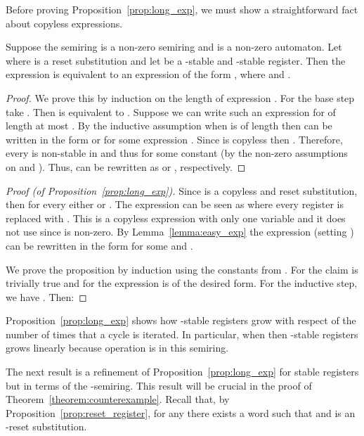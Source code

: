 Before proving Proposition~\ref{prop:long_exp}, we must show a straightforward fact about copyless expressions.
\begin{lemma}
	\label{lemma:easy_exp}
	Suppose the semiring  is a non-zero semiring and  is a non-zero automaton.
	Let  where  is a reset substitution and let  be a -stable and -stable register.
Then the expression  is equivalent to an expression of the form , where  and .
\end{lemma}

\begin{proof}
	We prove this by induction on the length of expression . For the base step take . Then  is equivalent to . Suppose we can write such an expression  for  of length at most . By the inductive assumption when  is of length  then  can be written in the form  or  for some expression . 
Since  is copyless then .
	Therefore, every  is non-stable in  and thus  for some constant  (by the non-zero assumptions on  and ). 
Thus,  can be rewritten as  or , respectively.
\end{proof}


\begin{proof}[Proof (of Proposition~\ref{prop:long_exp})]
	Since  is a copyless and reset substitution, then for every  either  or . 
	The expression  can be seen as  where every register  is replaced with . This is a copyless expression with only one variable  and it does not use  since  is non-zero. By Lemma~\ref{lemma:easy_exp} the expression  (setting ) can be rewritten in the form  for some  and .
	
	We prove the proposition by induction using the constants  from . For  the claim is trivially true and for  the expression  is of the desired form.
For the inductive step, we have . Then:
	
 \end{proof}



Proposition~\ref{prop:long_exp} shows how -stable registers grow with respect of the number of times that a cycle is iterated.
In particular, when  then -stable registers grows linearly because  operation is  in this semiring. 

The next result is a refinement of Proposition~\ref{prop:long_exp} for stable registers but in terms of the -semiring. This result will be crucial in the proof of Theorem~\ref{theorem:counterexample}.
Recall that, by Proposition~\ref{prop:reset_register}, for any  there exists a word  such that  and  is an -reset substitution.

